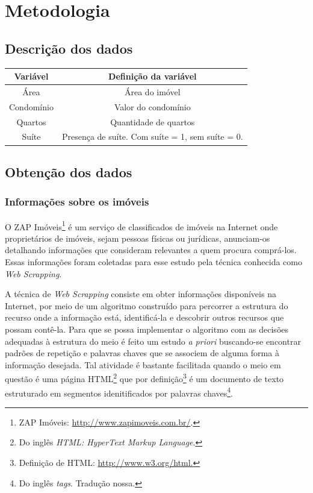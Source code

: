 \pagestyle{empty}
\cleardoublepage
\pagestyle{fancy}

\chapter{Metodologia}\label{chap:metodologia}


\section{Descrição dos dados}\label{sec:descricao_dados}

\begin{table}[htp]
	\begin{center}
		\begin{tabular}{|c|c|}
\hline

\textbf{Variável} & \textbf{Definição da variável}  \\ 
\hline Área & Área do imóvel \\ 
\hline Condomínio & Valor do condomínio \\ 
\hline Quartos & Quantidade de quartos \\ 
\hline Suíte & Presença de suíte. Com suíte = 1, sem suíte = 0. \\ 
\hline 
\end{tabular} 
\end{center}
\end{table}

\section{Obtenção dos dados}

\subsection{Informações sobre os imóveis}\label{sec:captura_zap}

O ZAP Imóveis\footnote{ZAP Imóveis: \url{http://www.zapimoveis.com.br/}.} é um serviço de classificados de imóveis na Internet onde proprietários de imóveis, sejam pessoas físicas ou jurídicas, anunciam-os detalhando informações que consideram relevantes a quem procura comprá-los. Essas informações foram coletadas para esse estudo pela técnica conhecida como \textit{Web Scrapping}.

A técnica de \textit{Web Scrapping} consiste em obter informações disponíveis na Internet, por meio de um algoritmo construído para percorrer a estrutura do recurso onde a informação está, identificá-la e descobrir outros recursos que possam contê-la. Para que se possa implementar o algoritmo com as decisões adequadas à estrutura do meio é feito um estudo \textit{a priori} buscando-se encontrar padrões de repetição e palavras chaves que se associem de alguma forma à informação desejada. Tal atividade é bastante facilitada quando o meio em questão é uma página HTML\footnote{Do inglês \textit{HTML: HyperText Markup Language}.} que por definição\footnote{Definição de HTML: \url{http://www.w3.org/html.}} é um documento de texto estruturado em segmentos idenitificados por palavras chaves\footnote{Do inglês \textit{tags}. Tradução nossa.}. 

